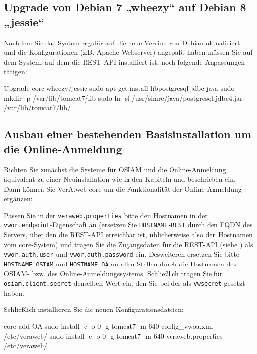 \fi%

\subsection{Upgrade von Debian 7 „wheezy“ auf Debian 8 „jessie“}

Nachdem Sie das System regulär auf die neue Version von Debian
aktualisiert und die Konfigurationen (z.B. Apache Webserver)
angepaßt haben müssen Sie auf dem System, auf dem die REST-API
installiert ist, noch folgende Anpassungen tätigen:\keinumbruch

\begin{minipage}{\textwidth}
\begin{lstdump}{Upgrade core wheezy/jessie}
sudo apt-get install libpostgresql-jdbc-java
sudo mkdir -p /var/lib/tomcat7/lib
sudo ln -sf /usr/share/java/postgresql-jdbc4.jar /var/lib/tomcat7/lib/
\end{lstdump}
\end{minipage}

\ifoa\ifupgradeanleitung\else%

\subsection{Ausbau einer bestehenden Basisinstallation um die Online-Anmeldung}

Richten Sie zunächst die Systeme für OSIAM und die Online-Anmeldung
äquivalent zu einer Neuinstallation \dash wie in den Kapiteln
 und  beschrieben
\dash ein. Dann können Sie VerA.web-core um die Funktionalität der
Online-Anmeldung ergänzen:

Passen Sie in der \texttt{veraweb.properties} bitte den Hostnamen
in der \texttt{vwor.endpoint}-Eigenschaft an (ersetzen Sie
\texttt{HOSTNAME-REST} durch den FQDN des Servers, über den die
REST-API erreichbar ist, üblicherweise also den Hostnamen vom
core-System) und tragen Sie die Zugangsdaten für die REST-API
(siehe ) als \texttt{vwor.auth.user}
und \texttt{vwor.auth.password} ein.
Desweiteren ersetzen Sie bitte \texttt{HOSTNAME-OSIAM} und
\texttt{HOSTNAME-OA} an allen Stellen durch die Hostnamen
des OSIAM- bzw. des Online-Anmeldungssystems. Schließlich
tragen Sie für \texttt{osiam.client.secret} denselben Wert
ein, den Sie bei der 
als \texttt{vwsecret} gesetzt haben.

\begin{minipage}{\textwidth}
Schließlich installieren Sie die neuen Konfigurationsdateien:

\begin{lstdump}{core add OA}
sudo install -c -o 0 -g tomcat7 -m 640 config_vwoa.xml /etc/veraweb/
sudo install -c -o 0 -g tomcat7 -m 640 veraweb.properties /etc/veraweb/
\end{lstdump}
\end{minipage}

